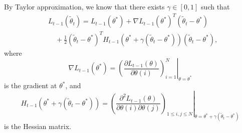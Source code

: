 \documentclass{article}
\theoremstyle{definition}
\begin{document}
By Taylor approximation, we know that there exists $\gamma\in[0,1]$ such that
\begin{align}\label{eq:taylor}
&L_{t-1}(\tilde{\theta}_t) = L_{t-1}(\theta^*) + \nabla L_{t-1}(\theta^*)^T(\tilde{\theta}_t - \theta^*)\nonumber\\
&\quad + \frac{1}{2}(\tilde{\theta}_t - \theta^*)^T H_{t-1}(\theta^* + \gamma(\tilde{\theta}_t - \theta^*))(\tilde{\theta}_t - \theta^*),
\end{align}
where 
$$\nabla L_{t-1}(\theta^*) = \left.\left(\frac{\partial L_{t-1}(\theta)}{\partial \theta(i)}\right)^N_{i=1}\right|_{\theta = \theta^*}$$ is the gradient at $\theta^*$, and
$$H_{t-1}(\theta^* + \gamma(\tilde{\theta}_t - \theta^*)) = \left.\left(\frac{\partial^2 L_{t-1}(\theta)}{\partial \theta(i)\partial\theta(j)}\right)_{1\leq i, j\leq N}\right|_{\theta = \theta^* + \gamma(\tilde{\theta}_t - \theta^*)}$$ is the Hessian matrix.
\end{document}

